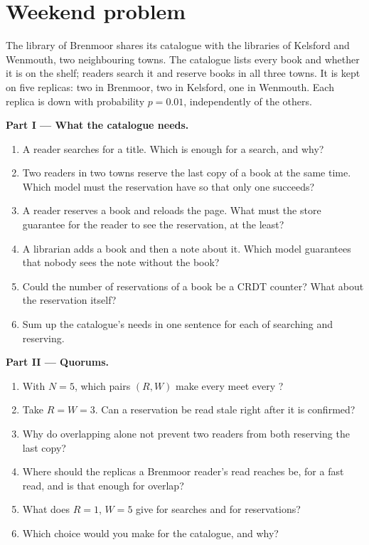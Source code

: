 \section{Weekend problem}\label{sec:b3:replication-and-consensus:problem}

\begin{problem}\label{pb:b3:replication-and-consensus:1}
The library of Brenmoor shares its catalogue with the libraries of Kelsford and Wenmouth, two neighbouring towns. The catalogue lists every book and whether it is on the shelf; readers search it and reserve books in all three towns. It is kept on five replicas: two in Brenmoor, two in Kelsford, one in Wenmouth. Each replica is down with probability $p = 0.01$, independently of the others.

\medskip\noindent\textbf{Part I --- What the catalogue needs.}
\begin{enumerate}
  \item A reader searches for a title. Which  is enough for a search, and why?
  \item Two readers in two towns reserve the last copy of a book at the same time. Which model must the reservation have so that only one succeeds?
  \item A reader reserves a book and reloads the page. What must the store guarantee for the reader to see the reservation, at the least?
  \item A librarian adds a book and then a note about it. Which model guarantees that nobody sees the note without the book?
  \item Could the number of reservations of a book be a CRDT counter? What about the reservation itself?
  \item Sum up the catalogue's needs in one sentence for each of searching and reserving.
\end{enumerate}

\medskip\noindent\textbf{Part II --- Quorums.}
\begin{enumerate}[resume]
  \item With $N = 5$, which pairs $(R, W)$ make every  meet every ?
  \item Take $R = W = 3$. Can a reservation be read stale right after it is confirmed?
  \item Why do overlapping  alone not prevent two readers from both reserving the last copy?
  \item Where should the replicas a Brenmoor reader's read reaches be, for a fast read, and is that enough for overlap?
  \item What does $R = 1$, $W = 5$ give for searches and for reservations?
  \item Which choice would you make for the catalogue, and why?
\end{enumerate}


\end{problem}
